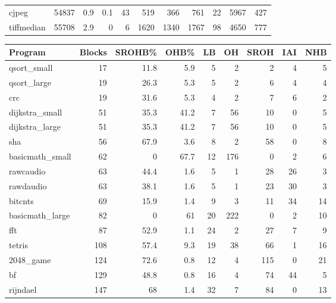 \begin{tabular}{lrrrrrrrrrr}
 cjpeg           &          54837 &      0.9 &    0.1 &   43 &    519 &        366 &          761 &    22 &  5967 &   427 \\
 tiffmedian      &          55708 &      2.9 &    0   &    6 &   1620 &       1340 &         1767 &    98 &  4650 &   777 \\
\hline
\end{tabular}\begin{tabular}{lrrrrrrrr}
\hline
 Program         &   Blocks &   SROHB\% &   OHB\% &   LB &   OH &   SROH &   IAI &   NHB \\
\hline
 qsort\_small     &       17 &     11.8 &    5.9 &    5 &    2 &      2 &     4 &     5 \\
 qsort\_large     &       19 &     26.3 &    5.3 &    5 &    2 &      6 &     4 &     4 \\
 crc             &       19 &     31.6 &    5.3 &    4 &    2 &      7 &     6 &     2 \\
 dijkstra\_small  &       51 &     35.3 &   41.2 &    7 &   56 &     10 &     0 &     5 \\
 dijkstra\_large  &       51 &     35.3 &   41.2 &    7 &   56 &     10 &     0 &     5 \\
 sha             &       56 &     67.9 &    3.6 &    8 &    2 &     58 &     0 &     8 \\
 basicmath\_small &       62 &      0   &   67.7 &   12 &  176 &      0 &     2 &     6 \\
 rawcaudio       &       63 &     44.4 &    1.6 &    5 &    1 &     28 &    26 &     3 \\
 rawdaudio       &       63 &     38.1 &    1.6 &    5 &    1 &     23 &    30 &     3 \\
 bitcnts         &       69 &     15.9 &    1.4 &    9 &    3 &     11 &    34 &    14 \\
 basicmath\_large &       82 &      0   &   61   &   20 &  222 &      0 &     2 &    10 \\
 fft             &       87 &     52.9 &    1.1 &   24 &    2 &     27 &     7 &     9 \\
 tetris          &      108 &     57.4 &    9.3 &   19 &   38 &     66 &     1 &    16 \\
 2048\_game       &      124 &     72.6 &    0.8 &   12 &    4 &    115 &     0 &    21 \\
 bf              &      129 &     48.8 &    0.8 &   16 &    4 &     74 &    44 &     5 \\
 rijndael        &      147 &     68   &    1.4 &   32 &    7 &     84 &     0 &    13 \\

\end{tabular}
